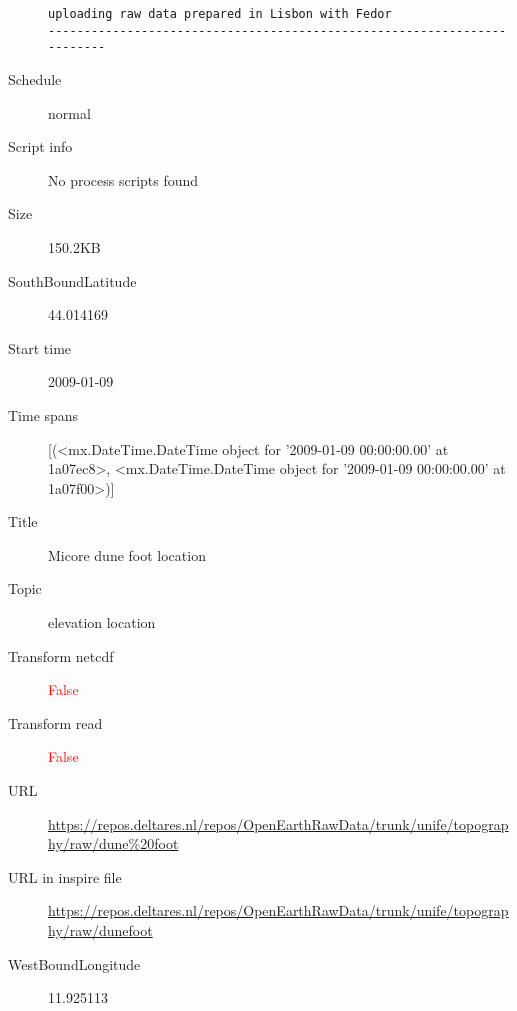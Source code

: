 \documentclass[9]{report}
\begin{document}
\begin{description}
\begin{verbatim}
uploading raw data prepared in Lisbon with Fedor
------------------------------------------------------------------------

\end{verbatim}
  \item[Schedule] normal
  \item[Script info] No process scripts found
  \item[Size] 150.2KB
  \item[SouthBoundLatitude] 44.014169
  \item[Start time] 2009-01-09
  \item[Time spans] [(<mx.DateTime.DateTime object for '2009-01-09 00:00:00.00' at 1a07ec8>, <mx.DateTime.DateTime object for '2009-01-09 00:00:00.00' at 1a07f00>)]
  \item[Title]  Micore dune foot location 
  \item[Topic] elevation location
  \item[Transform netcdf] \textcolor{red}{False}
  \item[Transform read] \textcolor{red}{False}
  \item[URL] \href{https://repos.deltares.nl/repos/OpenEarthRawData/trunk/unife/topography/raw/dune\%20foot}{https://repos.deltares.nl/repos/OpenEarthRawData/trunk/unife/topography/raw/dune\%20foot}
  \item[URL in inspire file] \href{https://repos.deltares.nl/repos/OpenEarthRawData/trunk/unife/topography/raw/dunefoot}{https://repos.deltares.nl/repos/OpenEarthRawData/trunk/unife/topography/raw/dunefoot}
  \item[WestBoundLongitude] 11.925113
\end{description}
\end{document}
